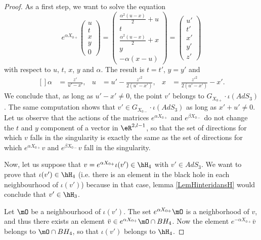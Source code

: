 \begin{proof}
	As a first step, we want to solve the equation
	\begin{equation}
		e^{\alpha X_{0+}}\begin{pmatrix}
			u	\\ 
			t	\\ 
			x	\\ 
			y	\\ 
			0	
		\end{pmatrix}=
		\begin{pmatrix}
			\frac{ \alpha^2(u-x) }{2}+u	\\ 
			t	\\ 
			\frac{ \alpha^2(u-x) }{2}+x	\\ 
			y	\\ 
			-\alpha(x-u)	
		\end{pmatrix}=\begin{pmatrix}
			u'	\\ 
			t'	\\ 
			x'	\\ 
			y'	\\ 
			z'	
		\end{pmatrix}
	\end{equation}
	with respect to $u$, $t$, $x$, $y$ and $\alpha$. The result is $t=t'$, $y=y'$ and
	\begin{equation}
		\begin{aligned}[]
			\alpha&=\frac{ z' }{ u'-x' },&u&=u'-\frac{ z'^2 }{ 2(u'-x') },&x&=\frac{ z'^2 }{ 2(u'-x') }-x'.
		\end{aligned}
	\end{equation}
	We conclude that, as long as $u'-x'\neq 0$, the point $v'$ belongs to $G_{X_{0+}}\cdot\iota(AdS_3)$. The same computation shows that $v'\in G_{X_{0-}}\cdot\iota(AdS_3)$ as long as $x'+u'\neq 0$. Let us observe that the actions of the matrices $ e^{\alpha X_{0+}}$ and $ e^{\beta X_{0-}}$ do not change the $t$ and $y$ component of a vector in $\eR^{2,l-1}$, so that the set of directions for which $v$ falls in the singularity is exactly the same as the set of directions for which $ e^{\alpha X_{0+}}v$ and $ e^{\beta X_{0-}}v$ fall in the singularity.
	
	Now, let us suppose that $v= e^{\alpha X_{0+}}\iota(v')\in\hH_4$ with $v'\in AdS_3$. We want to prove that $\iota(v')\in\hH_4$ (i.e. there is an element in the black hole in each neighbourhood of $\iota(v')$) because in that case, lemma \ref{LemHinteridansH} would conclude that $v'\in\hH_3$.

	Let $\mO$ be a neighbourhood of $\iota(v')$. The set $ e^{\alpha X_{0+}}\mO$ is a neighborhood of $v$, and thus there exists an element $\bar v\in e^{\alpha X_{0+}}\mO\cap BH_4$. Now the element $ e^{-\alpha X_{0+}}\bar v$ belongs to $\mO\cap BH_4$, so that $\iota(v')$ belongs to $\hH_4$.
\end{proof}

